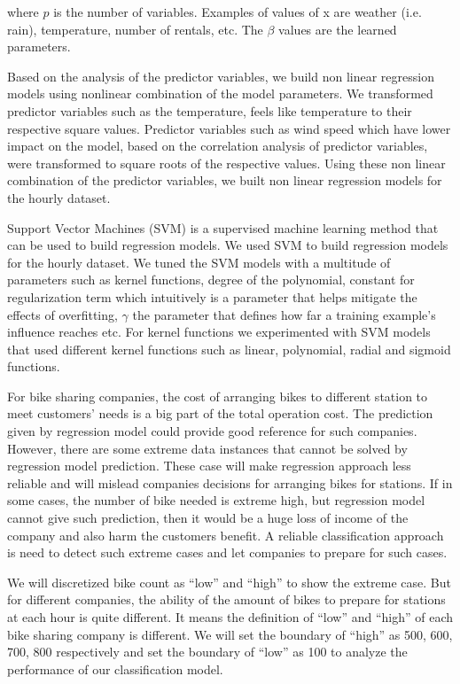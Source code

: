 \documentclass[12pt]{article}
\begin{document}
where $p$ is the number of variables. Examples of values of x are weather
(i.e. rain), temperature, number of rentals, etc. The $\beta$ values are the
learned parameters.



Based on the analysis of the predictor variables, we build non linear
regression models using nonlinear combination of the model parameters. We
transformed predictor variables such as the temperature, feels like temperature
to their respective square values. Predictor variables such as wind speed which
have lower impact on the model, based on the correlation analysis of predictor
variables, were transformed to square roots of the respective values.  Using
these non linear combination of the predictor variables, we built non linear
regression models for the hourly dataset.



Support Vector Machines (SVM) is a supervised machine learning method that can
be used to build regression models.  We used SVM to build regression models for
the hourly dataset. We tuned the SVM models with a multitude of parameters such
as kernel functions, degree of the polynomial, constant for regularization term
which intuitively is a parameter that helps mitigate the effects of
overfitting, $\gamma$ the parameter that defines how far a training example's
influence reaches etc. For kernel functions we experimented with SVM models
that used different kernel functions such as linear, polynomial, radial and
sigmoid functions.



For bike sharing companies, the cost of arranging bikes to different station to
meet customers’ needs is a big part of the total operation cost. The prediction
given by regression model could provide good reference for such
companies. However, there are some extreme data instances that cannot be solved
by regression model prediction. These case will make regression approach less
reliable and will mislead companies decisions for arranging bikes for
stations. If in some cases, the number of bike needed is extreme high, but
regression model cannot give such prediction, then it would be a huge loss of
income of the company and also harm the customers benefit.  A reliable
classification approach is need to detect such extreme cases and let companies
to prepare for such cases.

We will discretized bike count as ``low'' and ``high'' to show the extreme
case. But for different companies, the ability of the amount of bikes to
prepare for stations at each hour is quite different. It means the definition
of ``low'' and ``high'' of each bike sharing company is different. We will set
the boundary of ``high'' as 500, 600, 700, 800 respectively and set the
boundary of ``low'' as 100 to analyze the performance of our classification
model.
\end{document}
